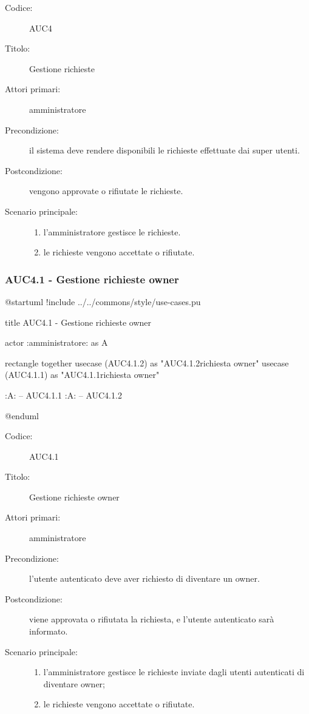\documentclass[casi-duso]{subfiles}
\begin{document}
\begin{description}
  \item[Codice:] AUC4
  \item[Titolo:] Gestione richieste
  \item[Attori primari:] amministratore
  \item[Precondizione:] il sistema deve rendere disponibili le richieste effettuate dai super utenti.
  \item[Postcondizione:] vengono approvate o rifiutate le richieste.
  \item[Scenario principale:] 
  \begin{enumerate}
    \item l'amministratore gestisce le richieste.
    \item le richieste vengono accettate o rifiutate.
  \end{enumerate}
\end{description}

\subsubsection{AUC4.1 - Gestione richieste owner}%
\label{subsub:AUC4.1}

\begin{plantuml}
@startuml
!include ../../commons/style/use-cases.pu

title AUC4.1 - Gestione richieste owner

actor :amministratore: as A

rectangle {
  together {
    usecase (AUC4.1.2) as "AUC4.1.2\nRifiuta richiesta owner"
    usecase (AUC4.1.1) as "AUC4.1.1\nAccetta richiesta owner"
  }
}

:A: -- AUC4.1.1
:A: -- AUC4.1.2

@enduml
\end{plantuml}

\begin{description}
  \item[Codice:] AUC4.1
  \item[Titolo:] Gestione richieste owner
  \item[Attori primari:] amministratore
  \item[Precondizione:] l'utente autenticato deve aver richiesto di diventare un owner.
  \item[Postcondizione:] viene approvata o rifiutata la richiesta, e l'utente autenticato sarà informato.
  \item[Scenario principale:] 
  \begin{enumerate}
    \item l'amministratore gestisce le richieste inviate dagli utenti autenticati di diventare owner;
    \item le richieste vengono accettate o rifiutate.
  \end{enumerate}
\end{description}
\end{document}

